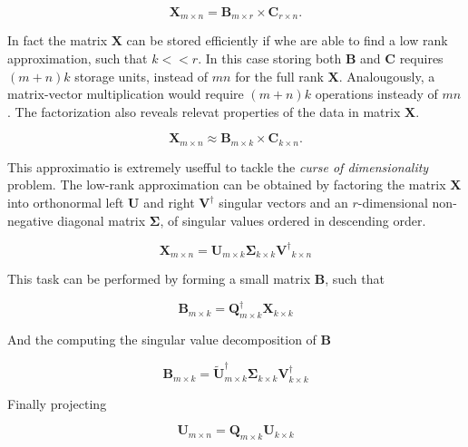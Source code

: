 \begin{equation}
    \mathbf{X}_{m \times n} = \mathbf{B}_{m \times r} \times \mathbf{C}_{r \times n}.
\end{equation}

In fact the matrix $\mathbf{X}$ can be stored efficiently if whe are able to find a low rank approximation, such that $k << r$. In this case storing both $\mathbf{B}$ and $\mathbf{C}$ requires $(m+n)k$ storage units, instead of $mn$ for the full rank $\mathbf{X}$. Analougously, a matrix-vector multiplication would require $(m+n)k$ operations insteady of $mn$. The factorization also reveals relevat properties of the data in matrix $\mathbf{X}$.

\begin{equation}
    \mathbf{X}_{m \times n} \approx \mathbf{B}_{m \times k} \times \mathbf{C}_{k \times n}.
\end{equation}

This approximatio is extremely usefful to tackle the \textit{curse of dimensionality} problem. The low-rank approximation can be obtained by factoring the matrix $\mathbf{X}$ into orthonormal left $\mathbf{U}$ and right $\mathbf{V}^\dagger$ singular vectors and an $r$-dimensional non-negative diagonal matrix $\mathbf{\Sigma}$, of singular values ordered in descending order.

\begin{equation}
    \mathbf{X}_{m \times n} = \mathbf{U}_{m \times k} \mathbf{\Sigma}_{k \times k} {\mathbf{V}^\dagger}_{k \times n}
\end{equation}

This task can be performed by forming a small matrix $\mathbf{B}$, such that

\begin{equation}
    \mathbf{B}_{m \times k} = \mathbf{Q}_{m \times k}^\dagger \mathbf{X}_{k \times k} 
\end{equation}

And the computing the singular value decomposition of $\mathbf{B}$

\begin{equation}
    \mathbf{B}_{m \times k} =  \mathbf{\tilde U}_{m \times k}^\dagger \mathbf{\Sigma}_{k \times k} \mathbf{V}_{k \times k}^\dagger
\end{equation}

Finally projecting 

\begin{equation}
    \mathbf{U}_{m \times n} = \mathbf{Q}_{m \times k}\mathbf{U}_{k \times k}
\end{equation}


